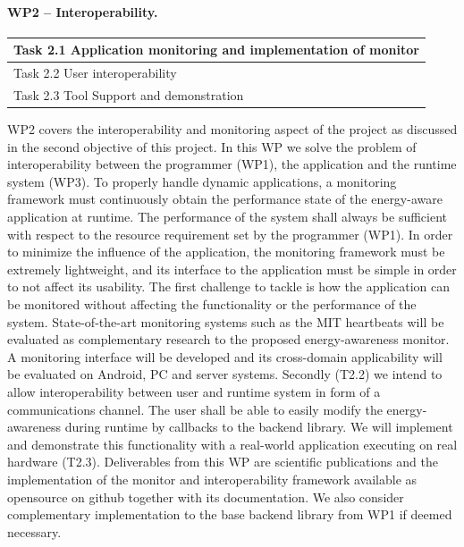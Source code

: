 \documentclass{article}
\begin{document}
\paragraph{WP2 -- Interoperability.}
\begin{table}
\vspace{-0.5cm}
\small
\begin{tabular}{ | l |}
\hline
Task 2.1 Application monitoring and implementation of monitor  \\ \hline
Task 2.2 User interoperability   \\ \hline
Task 2.3 Tool Support and demonstration	\\ \hline
\end{tabular}
\vspace{-0.3cm}
\end{table}
WP2 covers the interoperability and monitoring aspect of the project as discussed in the second objective of this project.
In this WP we solve the problem of interoperability between the programmer (WP1), the application and the runtime system (WP3).
To properly handle dynamic applications, a monitoring framework must continuously obtain the performance state of the energy-aware application at runtime.
The performance of the system shall always be sufficient with respect to the resource requirement set by the programmer (WP1).
In order to minimize the influence of the application, the monitoring framework must be extremely lightweight, and its interface to the application must be simple in order to not affect its usability.
The first challenge to tackle is how the application can be monitored without affecting the functionality or the performance of the system.
State-of-the-art monitoring systems such as the MIT heartbeats \cite{Hoffmann:10} will be evaluated as complementary research to the proposed energy-awareness monitor.
A monitoring interface will be developed and its cross-domain applicability will be evaluated on Android, PC and server systems.
Secondly (T2.2) we intend to allow interoperability between user and runtime system in form of a communications channel.
The user shall be able to easily modify the energy-awareness during runtime by callbacks to the backend library.
We will implement and demonstrate this functionality with a real-world application executing on real hardware (T2.3).
Deliverables from this WP are scientific publications and the implementation of the monitor and interoperability framework available as opensource on github together with its documentation.
We also consider complementary implementation to the base backend library from WP1 if deemed necessary.
\end{document}
